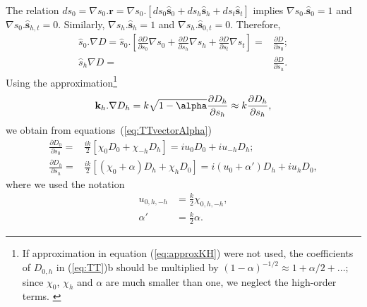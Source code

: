 \documentclass[preprint]{iucr}              %
\newcommand{\inblue}[1]{{\color{blue}#1}}
\begin{document}
The relation $d s_0 = \nabla s_0 . \textbf{r}= \nabla s_0 . [ d s_0 \hat{\textbf{s}}_0 + d s_h \hat{\textbf{s}}_h + d s_t \hat{\textbf{s}}_t ]$ implies $\nabla s_0 . \hat{\textbf{s}}_0=1$ and $\nabla s_0 . \hat{\textbf{s}}_{h,t}=0$. Similarly, $\nabla s_h . \hat{\textbf{s}}_h=1$ and $\nabla s_h . \hat{\textbf{s}}_{0,t}=0$. Therefore, 
\begin{subequations}
\label{eq:equalities}
\begin{align}
\hat s_0 . \nabla D=
\hat s_0 . \left[ 
\frac{\partial D}{\partial s_0} \nabla s_0 + 
\frac{\partial D}{\partial s_h} \nabla s_h +
\frac{\partial D}{\partial s_t} \nabla s_t
\right] 
=& \frac{\partial D}{\partial s_0}
; \\
\hat s_h \nabla D =& 
\frac{\partial D}{\partial s_h}.
\end{align}
\end{subequations}
Using the approximation\footnote{
\inblue{
If approximation in equation (\ref{eq:approxKH}) were not used, the coefficients of $D_{0,h}$ in (\ref{eq:TT})b should be multiplied by $(1-\alpha)^{-1/2} \approx 1 + \alpha/2 + ...$; since $\chi_0$, $\chi_h$ and $\alpha$ are much smaller than one, we neglect the high-order terms.
}
}
\begin{equation}\label{eq:approxKH}
\textbf k_h . \nabla D_h = 
k \sqrt{1-\alpha} \frac{\partial D_h}{\partial s_h}
\approx k \frac{\partial D_h}{ \partial s_h},
\end{equation}
we obtain from equations~(\ref{eq:TTvectorAlpha})
\begin{subequations}\label{eq:TT}
\begin{align}
\frac{\partial D_0}{\partial s_0} =& \frac{ik}{2} \left[ \chi_0 D_0+ \chi_{-h} D_h \right] = i u_0 D_0 + i u_{-h} D_h; \\
\frac{\partial D_h}{\partial s_h} =& \frac{ik}{2} \left[ (\chi_0 + \alpha) D_h+ \chi_{h} D_0 \right] = i (u_0 + \alpha') D_h + i u_h D_0,
\end{align}
\end{subequations}
where we used the notation 
\begin{subequations}
\label{eq:uandalphaprime}
\begin{align}
    u_{0,h,-h}&=\frac{k}{2} \chi_{0,h,-h},  \\
     \alpha'  &= \frac{k}{2}  \alpha.
\end{align}
\end{subequations}
\end{document}
